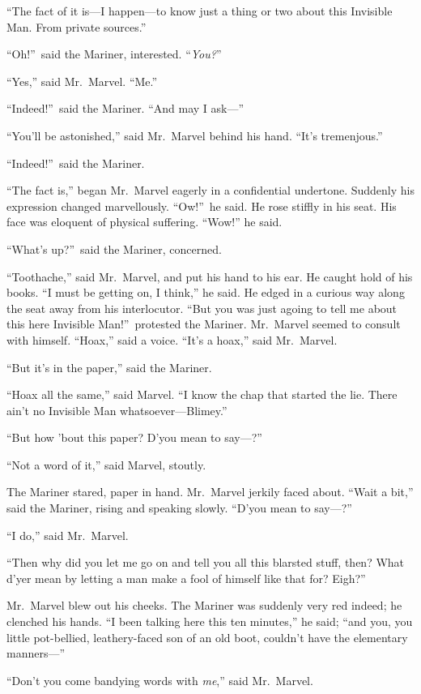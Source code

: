 “The fact of it is—I happen—to know just a thing or two about this Invisible Man. From private sources.”

“Oh!”\ said the Mariner, interested. “\emph{You?}”

“Yes,” said Mr.\ Marvel. “Me.”

“Indeed!”\ said the Mariner. “And may I ask—”

“You’ll be astonished,” said Mr.\ Marvel behind his hand. “It’s tremenjous.”

“Indeed!”\ said the Mariner.

“The fact is,” began Mr.\ Marvel eagerly in a confidential undertone. Suddenly his expression changed marvellously. “Ow!”\ he said. He rose stiffly in his seat. His face was eloquent of physical suffering. “Wow!” he said.

“What’s up?”\ said the Mariner, concerned.

“Toothache,” said Mr.\ Marvel, and put his hand to his ear. He caught hold of his books. “I must be getting on, I think,” he said. He edged in a curious way along the seat away from his interlocutor. “But you was just agoing to tell me about this here Invisible Man!”\ protested the Mariner. Mr.\ Marvel seemed to consult with himself. “Hoax,” said a voice. “It’s a hoax,” said Mr.\ Marvel.

“But it’s in the paper,” said the Mariner.

“Hoax all the same,” said Marvel. “I know the chap that started the lie. There ain’t no Invisible Man whatsoever—Blimey.”

“But how ’bout this paper? D’you mean to say—?”

“Not a word of it,” said Marvel, stoutly.

The Mariner stared, paper in hand. Mr.\ Marvel jerkily faced about. “Wait a bit,” said the Mariner, rising and speaking slowly. “D’you mean to say—?”

“I do,” said Mr.\ Marvel.

“Then why did you let me go on and tell you all this blarsted stuff, then? What d’yer mean by letting a man make a fool of himself like that for? Eigh?”

Mr.\ Marvel blew out his cheeks. The Mariner was suddenly very red indeed; he clenched his hands. “I been talking here this ten minutes,” he said; “and you, you little pot-bellied, leathery-faced son of an old boot, couldn’t have the elementary manners—”

“Don’t you come bandying words with \emph{me},” said Mr.\ Marvel.

